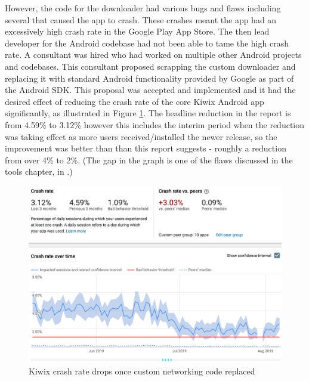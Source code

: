 However, the code for the downloader had various bugs and flaws including several that caused the app to crash. These crashes meant the app had an excessively high crash rate in the Google Play App Store. The then lead developer for the Android codebase had not been able to tame the high crash rate. A consultant was hired who had worked on multiple other Android projects and codebases. This consultant proposed scrapping the custom downloader and replacing it with standard Android functionality provided by Google as part of the Android SDK. This proposal was accepted and implemented and it had the desired effect of reducing the crash rate of the core Kiwix Android app significantly, as illustrated in Figure \ref{fig:kiwix-crash-rate-drops-with-v2_5}. The headline reduction in the report is from 4.59\% to 3.12\% however this includes the interim period when the reduction was taking effect as more users received/installed the newer release, so the improvement was better than than this report suggests - roughly a reduction from over 4\% to 2\%. (The gap in the graph is one of the flaws discussed in the tools chapter, in .)

\begin{figure}
    \centering
    \includegraphics[width=\linewidth]{images/android-vitals-screenshots/kiwix/kiwix-crash-rate-drops-with-v2_5.pdf}
    \caption{Kiwix crash rate drops once custom networking code replaced}
    \label{fig:kiwix-crash-rate-drops-with-v2_5}
\end{figure}

